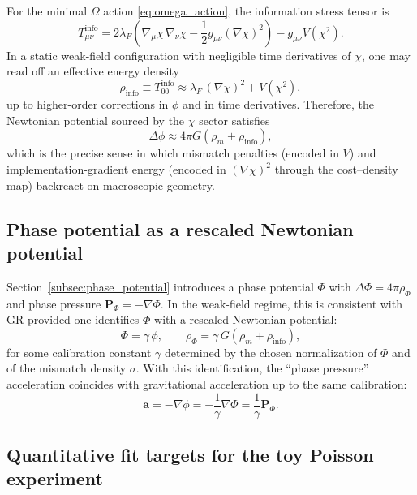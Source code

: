 For the minimal $\Omega$ action \eqref{eq:omega_action}, the information stress tensor is
\begin{equation}
  T^{\mathrm{info}}_{\mu\nu}
  = 2\lambda_{F}\left(\nabla_{\mu}\chi\,\nabla_{\nu}\chi - \frac{1}{2}g_{\mu\nu}(\nabla\chi)^{2}\right)
  - g_{\mu\nu} V(\chi^{2}).
\end{equation}
In a static weak-field configuration with negligible time derivatives of $\chi$, one may read off an effective energy density
\begin{equation}
  \rho_{\mathrm{info}}
  \equiv T^{\mathrm{info}}_{00}
  \approx \lambda_{F}\,(\nabla\chi)^2 + V(\chi^{2}),
\end{equation}
up to higher-order corrections in $\phi$ and in time derivatives.
Therefore, the Newtonian potential sourced by the $\chi$ sector satisfies
\begin{equation}
  \Delta\phi \approx 4\pi G\left(\rho_{m}+\rho_{\mathrm{info}}\right),
\end{equation}
which is the precise sense in which mismatch penalties (encoded in $V$) and implementation-gradient energy (encoded in $(\nabla\chi)^2$ through the cost--density map) backreact on macroscopic geometry.

\subsection{Phase potential as a rescaled Newtonian potential}
\label{app:phi_vs_Phi}

Section~\ref{subsec:phase_potential} introduces a phase potential $\Phi$ with $\Delta\Phi=4\pi\rho_{\Phi}$ and phase pressure $\mathbf{P}_{\Phi}=-\nabla\Phi$.
In the weak-field regime, this is consistent with GR provided one identifies $\Phi$ with a rescaled Newtonian potential:
\begin{equation}
  \Phi = \gamma\,\phi,
  \qquad
  \rho_{\Phi} = \gamma\,G\left(\rho_{m}+\rho_{\mathrm{info}}\right),
\end{equation}
for some calibration constant $\gamma$ determined by the chosen normalization of $\Phi$ and of the mismatch density $\sigma$.
With this identification, the ``phase pressure'' acceleration coincides with gravitational acceleration up to the same calibration:
\begin{equation}
  \mathbf{a} = -\nabla\phi = -\frac{1}{\gamma}\nabla\Phi = \frac{1}{\gamma}\mathbf{P}_{\Phi}.
\end{equation}

\subsection{Quantitative fit targets for the toy Poisson experiment}
\label{app:poisson_fit_targets}


